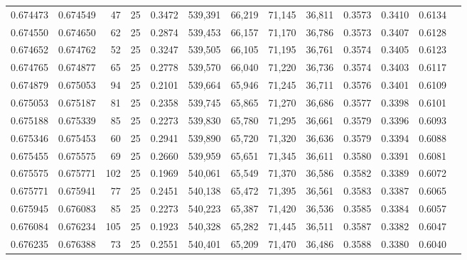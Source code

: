 \begin{tabular}{rrrrrrrrrrrrr}
0.674473 & 0.674549 &    47 &  25 &                                     0.3472 & 539,391 &  66,219 &  71,145 &  36,811 & 0.3573 & 0.3410 & 0.6134 \\
0.674550 & 0.674650 &    62 &  25 &                                     0.2874 & 539,453 &  66,157 &  71,170 &  36,786 & 0.3573 & 0.3407 & 0.6128 \\
0.674652 & 0.674762 &    52 &  25 &                                     0.3247 & 539,505 &  66,105 &  71,195 &  36,761 & 0.3574 & 0.3405 & 0.6123 \\
0.674765 & 0.674877 &    65 &  25 &                                     0.2778 & 539,570 &  66,040 &  71,220 &  36,736 & 0.3574 & 0.3403 & 0.6117 \\
0.674879 & 0.675053 &    94 &  25 &                                     0.2101 & 539,664 &  65,946 &  71,245 &  36,711 & 0.3576 & 0.3401 & 0.6109 \\
0.675053 & 0.675187 &    81 &  25 &                                     0.2358 & 539,745 &  65,865 &  71,270 &  36,686 & 0.3577 & 0.3398 & 0.6101 \\
0.675188 & 0.675339 &    85 &  25 &                                     0.2273 & 539,830 &  65,780 &  71,295 &  36,661 & 0.3579 & 0.3396 & 0.6093 \\
0.675346 & 0.675453 &    60 &  25 &                                     0.2941 & 539,890 &  65,720 &  71,320 &  36,636 & 0.3579 & 0.3394 & 0.6088 \\
0.675455 & 0.675575 &    69 &  25 &                                     0.2660 & 539,959 &  65,651 &  71,345 &  36,611 & 0.3580 & 0.3391 & 0.6081 \\
0.675575 & 0.675771 &   102 &  25 &                                     0.1969 & 540,061 &  65,549 &  71,370 &  36,586 & 0.3582 & 0.3389 & 0.6072 \\
0.675771 & 0.675941 &    77 &  25 &                                     0.2451 & 540,138 &  65,472 &  71,395 &  36,561 & 0.3583 & 0.3387 & 0.6065 \\
0.675945 & 0.676083 &    85 &  25 &                                     0.2273 & 540,223 &  65,387 &  71,420 &  36,536 & 0.3585 & 0.3384 & 0.6057 \\
0.676084 & 0.676234 &   105 &  25 &                                     0.1923 & 540,328 &  65,282 &  71,445 &  36,511 & 0.3587 & 0.3382 & 0.6047 \\
0.676235 & 0.676388 &    73 &  25 &                                     0.2551 & 540,401 &  65,209 &  71,470 &  36,486 & 0.3588 & 0.3380 & 0.6040 \\

\end{tabular}
